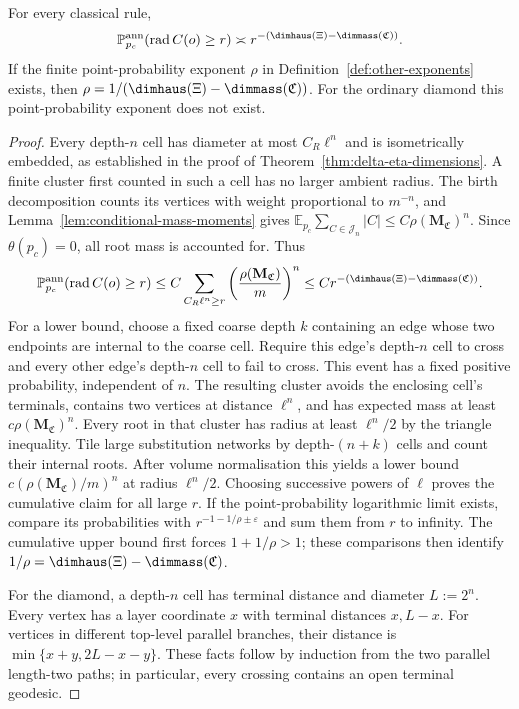 \begin{proposition}\label{prop:annealed-radius-tail}
For every classical rule,
\[
 \mathbb P_{p_c}^{\mathrm{ann}}(\operatorname{rad}C(o)\ge r)
 \asymp r^{-(\dimhaus(\Xi)-\dimmass(\mathfrak C))}.
\]
If the finite point-probability exponent $\rho$ in Definition~\ref{def:other-exponents} exists, then
$\rho=1/(\dimhaus(\Xi)-\dimmass(\mathfrak C))$.
For the ordinary diamond this point-probability exponent does not exist.
\end{proposition}
\begin{proof}
Every depth-$n$ cell has diameter at most $C_R\ell^n$ and is isometrically embedded, as established in the proof of Theorem~\ref{thm:delta-eta-dimensions}.
A finite cluster first counted in such a cell has no larger ambient radius.
The birth decomposition counts its vertices with weight proportional to $m^{-n}$, and Lemma~\ref{lem:conditional-mass-moments} gives
$\mathbb E_{p_c}\sum_{C\in\mathcal J_n}|C|\le C\rho(\mathbf M_{\mathfrak C})^n$.
Since $\theta(p_c)=0$, all root mass is accounted for.
Thus
\[
 \mathbb P_{p_c}^{\mathrm{ann}}(\operatorname{rad}C(o)\ge r)
 \le C\sum_{C_R\ell^n\ge r}
 \left(\frac{\rho(\mathbf M_{\mathfrak C})}{m}\right)^n
 \le Cr^{-(\dimhaus(\Xi)-\dimmass(\mathfrak C))}.
\]
For a lower bound, choose a fixed coarse depth $k$ containing an edge whose two endpoints are internal to the coarse cell.
Require this edge's depth-$n$ cell to cross and every other edge's depth-$n$ cell to fail to cross.
This event has a fixed positive probability, independent of $n$.
The resulting cluster avoids the enclosing cell's terminals, contains two vertices at distance $\ell^n$, and has expected mass at least $c\rho(\mathbf M_{\mathfrak C})^n$.
Every root in that cluster has radius at least $\ell^n/2$ by the triangle inequality.
Tile large substitution networks by depth-$(n+k)$ cells and count their internal roots.
After volume normalisation this yields a lower bound $c(\rho(\mathbf M_{\mathfrak C})/m)^n$ at radius $\ell^n/2$.
Choosing successive powers of $\ell$ proves the cumulative claim for all large $r$.
If the point-probability logarithmic limit exists, compare its probabilities with $r^{-1-1/\rho\pm\varepsilon}$ and sum them from $r$ to infinity.
The cumulative upper bound first forces $1+1/\rho>1$; these comparisons then identify $1/\rho=\dimhaus(\Xi)-\dimmass(\mathfrak C)$.

For the diamond, a depth-$n$ cell has terminal distance and diameter $L:=2^n$.
Every vertex has a layer coordinate $x$ with terminal distances $x,L-x$.
For vertices in different top-level parallel branches, their distance is
$\min\{x+y,2L-x-y\}$.
These facts follow by induction from the two parallel length-two paths; in particular, every crossing contains an open terminal geodesic.


\end{proof}
